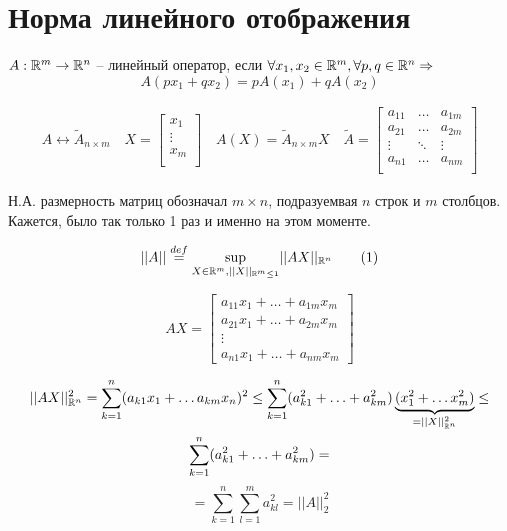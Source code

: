 \documentclass[main]{subfiles}
\begin{document}
\chapter{Норма линейного отображения}
\begin{definition}
    $A: {\mathbb{R}}^m \rightarrow {\mathbb{R}}^n$ -- линейный оператор, если
    $ \forall x_1, x_2 \in {\mathbb{R}}^m, \forall p, q \in {\mathbb{R}}^n \Rightarrow$
    \[A(px_1 + qx_2) = pA(x_1) + qA(x_2)\]
\end{definition}
\begin{gather*}
    A \leftrightarrow \tilde{A}_{n \times m} \quad
    X =
        \begin{bmatrix}
            x_1 \\
            \vdots \\
            x_m  \\
        \end{bmatrix} \quad 
    A(X) = \tilde{A}_{n \times m} X \quad
    \tilde{A} = 
    \begin{bmatrix}
        a_{11} & \ldots & a_{1m} \\
        a_{21} & \ldots & a_{2m} \\
        \vdots & \ddots & \vdots \\
        a_{n1} & \ldots & a_{nm} \\
    \end{bmatrix}
\end{gather*}

\begin{remark}
    Н.А. размерность матриц обозначал $m \times n$, подразуемвая $n$ строк и $m$ столбцов.
    Кажется, было так только 1 раз и именно на этом моменте.
\end{remark}

\begin{definition}
    \[||A|| \stackrel{def}{=} \underset{X \in {\mathbb{R}}^m, ||X||_{{\mathbb{R}}^m \leq 1}}{\sup}
     {||AX||_{{\mathbb{R}}^n}} \tag{1} \]
\end{definition}


\[AX = \begin{bmatrix}
    a_{11}x_1 + \ldots + a_{1m}x_m \\
    a_{21}x_1 + \ldots + a_{2m}x_m \\
    \vdots \\
    a_{n1}x_1 + \ldots + a_{nm}x_m
\end{bmatrix}\]



\begin{multline*}
    ||AX||^2_{{\mathbb{R}}^n} = \sum_{k=1}^n(a_{k1}x_1 + \ldots a_{km}x_n)^2 \leq 
    \sum_{k=1}^n (a^2_{k1} + \ldots + a^2_{km})\underbrace{(x_1^2 + \ldots x_m^2)}_{=||X||^2_{{\mathbb{R}}^n}} \leq \\
    \sum_{k=1}^n (a^2_{k1} + \ldots + a^2_{km}) =
\end{multline*}
     \[=\sum_{k=1}^n \sum_{l=1}^m a_{kl}^2 =||A||_2^2  \tag{2}\]
\end{document}
